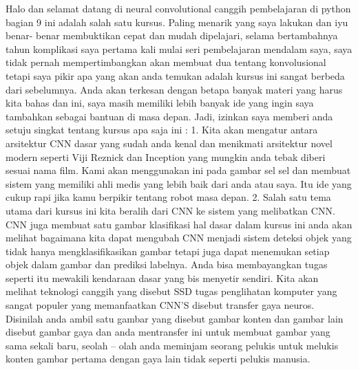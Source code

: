 Halo dan selamat datang di neural convolutional canggih pembelajaran di python bagian 9 ini adalah salah satu kursus. Paling menarik yang saya lakukan dan iyu benar- benar membuktikan cepat dan mudah dipelajari, selama bertambahnya tahun komplikasi saya pertama kali mulai seri pembelajaran mendalam saya, saya tidak pernah mempertimbangkan akan membuat dua tentang konvolusional tetapi saya pikir apa yang akan anda temukan adalah kursus ini sangat berbeda dari sebelumnya. Anda akan terkesan dengan betapa banyak materi yang harus kita bahas dan ini, saya masih memiliki lebih banyak ide yang ingin saya tambahkan sebagai bantuan di masa depan.
Jadi, izinkan saya memberi anda setuju singkat tentang kursus apa saja ini	:
1.	Kita akan mengatur antara arsitektur CNN dasar yang sudah anda kenal dan menikmati arsitektur novel modern seperti Viji Reznick dan Inception yang mungkin anda tebak diberi sesuai nama film. Kami akan menggunakan ini pada gambar sel sel dan membuat sistem yang memiliki ahli medis yang lebih baik dari anda atau saya. Itu ide yang cukup rapi jika kamu berpikir tentang robot masa depan.
2.	Salah satu tema utama dari kursus ini kita beralih dari CNN ke sistem yang melibatkan CNN. CNN juga membuat satu gambar klasifikasi hal dasar dalam kursus ini anda akan melihat bagaimana kita dapat mengubah CNN menjadi sistem deteksi objek yang tidak hanya mengklasifikasikan gambar tetapi juga dapat menemukan setiap objek dalam gambar dan prediksi labelnya. Anda bisa membayangkan tugas seperti itu mewakili kendaraan dasar yang bis menyetir sendiri. Kita akan melihat teknologi canggih yang disebut SSD tugas penglihatan komputer yang sangat populer yang memanfaatkan CNN’S disebut transfer gaya neuros. Disinilah anda ambil satu gambar yang disebut gambar konten dan gambar lain disebut gambar gaya dan anda mentransfer ini untuk membuat gambar yang sama sekali baru, seolah – olah anda meminjam seorang pelukis untuk melukis konten gambar pertama dengan gaya lain tidak seperti pelukis manusia.

